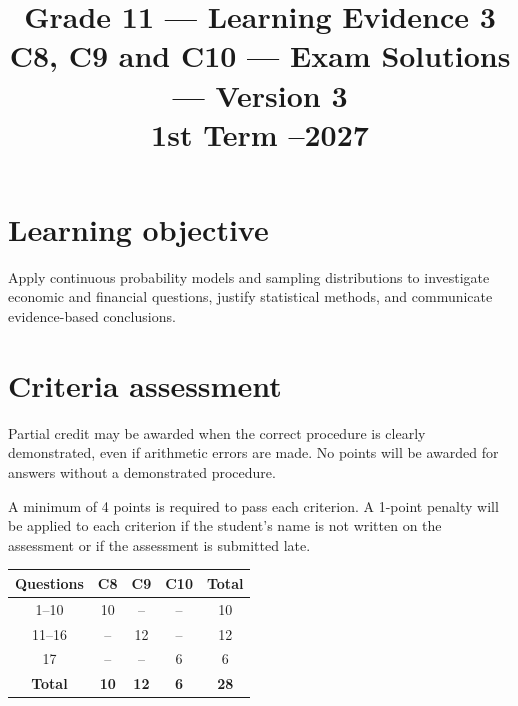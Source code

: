 \makeatletter
{}
\makeatother

\graphicspath{{./}{../}{../../}{../../../}{../../../../}{preamble/}{../preamble/}{../../preamble/}{../../../preamble/}{../../../../preamble/}}
\linespread{1.0}
\setlength{\parskip}{5pt}
\usepackage{needspace}
\title{Grade 11 --- Learning Evidence 3\\C8, C9 and C10 --- Exam Solutions --- Version 3\\\large 1st Term --2027}
\author{}
\date{}

\maketitle
\setcounter{tocdepth}{1}
\setcounter{secnumdepth}{2}
\label{toc}
\tableofcontents

\section*{Learning objective}
Apply continuous probability models and sampling distributions to investigate economic and financial questions, justify statistical methods, and communicate evidence-based conclusions.

\section*{Criteria assessment}
Partial credit may be awarded when the correct procedure is clearly demonstrated, even if arithmetic errors are made. No points will be awarded for answers without a demonstrated procedure.

A minimum of 4 points is required to pass each criterion. A 1-point penalty will be applied to each criterion if the student's name is not written on the assessment or if the assessment is submitted late.


\begin{center}
\begin{tabular}{|c|c|c|c|c|}
\hline
\textbf{Questions} & \textbf{C8} & \textbf{C9} & \textbf{C10} & \textbf{Total}\\\hline
1--10 & 10 & -- & -- & 10\\\hline
11--16 & -- & 12 & -- & 12\\\hline
17 & -- & -- & 6 & 6\\\hline
\textbf{Total} & \textbf{10} & \textbf{12} & \textbf{6} & \textbf{28}\\\hline
\end{tabular}
\end{center}


